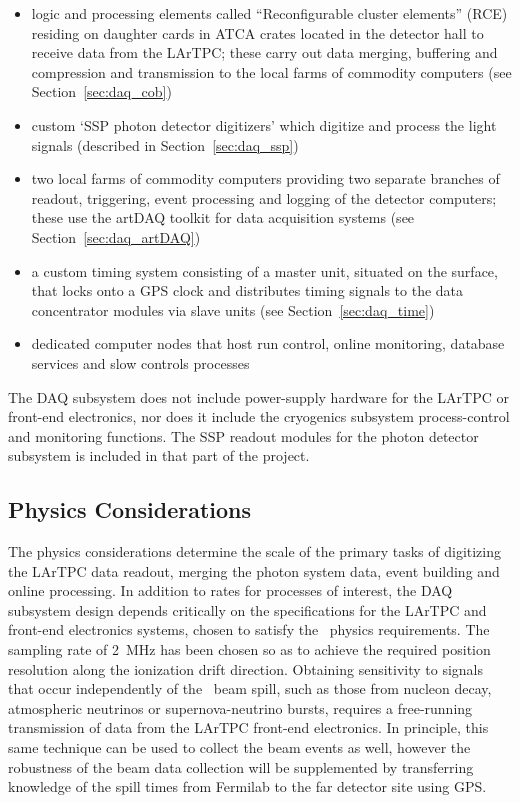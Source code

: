 \begin{itemize}
  \item logic and processing elements called ``Reconfigurable cluster
    elements'' (RCE) residing on daughter cards in ATCA crates  located
    in the detector hall to receive data from the LArTPC; these carry
    out data merging, buffering and compression and transmission to the
    local farms of commodity computers (see Section~\ref{sec:daq_cob})
  \item custom `SSP photon detector digitizers' which digitize and
    process the light signals (described in Section~\ref{sec:daq_ssp}) 
  \item two local farms of commodity computers providing two separate
    branches of readout, triggering, event processing and logging of the
    detector computers; these use the artDAQ toolkit for data
    acquisition systems (see Section~\ref{sec:daq_artDAQ})
  \item a custom timing system consisting of a master unit, situated
    on the surface, that locks onto a GPS clock and distributes timing
    signals to the data concentrator modules via slave units (see
    Section~\ref{sec:daq_time})
  \item dedicated computer nodes that host run control, online
    monitoring, database services and slow controls processes
\end{itemize}
%
The DAQ subsystem does not include power-supply hardware for the
LArTPC or front-end electronics, nor does it include the cryogenics
subsystem process-control and monitoring functions.  The SSP readout
modules for the photon detector subsystem is %
included in that part of
the project.

\subsection{Physics Considerations}
\label{sec:daq_phys}

The physics considerations determine the scale of the primary tasks of
digitizing the LArTPC data readout, merging the photon system data,
event building and online processing.  In addition to rates for
processes of interest, the DAQ subsystem design depends critically on
the specifications for the LArTPC and front-end electronics systems,
chosen to satisfy the \LBNE\ physics requirements.  The sampling rate
of 2~MHz has been chosen so as to achieve the required position
resolution along the ionization drift direction. Obtaining sensitivity
to signals that occur independently of the \LBNE\ beam spill, such as
those from nucleon decay, atmospheric neutrinos or supernova-neutrino
bursts, requires a free-running transmission of data from the LArTPC
front-end electronics.  In principle, this same technique can be used
to collect the beam events as well, however  the
robustness of the beam data collection will be supplemented by transferring knowledge of
the spill times from Fermilab to the far detector site using GPS.

